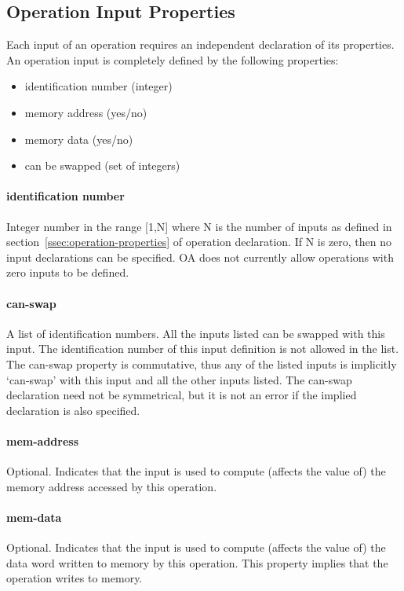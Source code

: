 \documentclass[a4paper,twoside]{tceusermanual}
\begin{document}
\subsection{Operation Input Properties}
\label{ssec:opinput-properties}

Each input of an operation requires an independent declaration of its
properties.  An operation input is completely defined by the following
properties:
\begin{itemize}
\item identification number (integer)
\item memory address (yes/no)
\item memory data (yes/no)
\item can be swapped (set of integers)
\end{itemize}

\paragraph{identification number}
Integer number in the range [1,N] where N is the number of inputs as defined
in section~\ref{ssec:operation-properties} of operation declaration.  If N
is zero, then no input declarations can be specified. OA does not currently
allow operations with zero inputs to be defined.

\paragraph{can-swap}
A list of identification numbers.  All the inputs listed can be swapped with
this input.  The identification number of this input definition is not
allowed in the list.  The can-swap property is commutative, thus any of the
listed inputs is implicitly `can-swap' with this input and all the other
inputs listed.  The can-swap declaration need not be symmetrical, but it is
not an error if the implied declaration is also specified.

\paragraph{mem-address}
Optional.  Indicates that the input is used to compute (affects the value
of) the memory address accessed by this operation.

\paragraph{mem-data}
Optional.  Indicates that the input is used to compute (affects the value
of) the data word written to memory by this operation.  This property
implies that the operation writes to memory.
\end{document}
